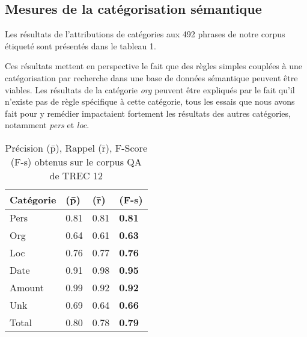 \documentclass[10pt,a4paper]{article}
\begin{document}

\subsection{Mesures de la catégorisation sémantique}\label{evaluation}

\par Les résultats de l'attributions de catégories aux 492 phrases de notre corpus étiqueté sont présentés dans le tableau 1. 
\par Ces résultats mettent en perspective le fait que des règles simples couplées à une catégorisation par recherche dans une base de données sémantique peuvent être viables. Les résultats de la catégorie \emph{org} peuvent être expliqués par le fait qu'il n'existe pas de règle spécifique à cette catégorie, tous les essais que nous avons fait pour y remédier impactaient fortement les résultats des autres catégories, notamment \emph{pers} et \emph{loc}.

\begin{table}[h]
    \begin{center}
        \begin{tabular}{|p{2.5cm}|l|l|l|}
            \hline
            Catégorie & (\={p}) & (\={r}) & (\={F}-s) \\
            \hline
            Pers & 0.81 & 0.81 & \textbf{0.81} \\
            \hline
            Org & 0.64 & 0.61 & \textbf{0.63} \\
            \hline
            Loc & 0.76 & 0.77 & \textbf{0.76} \\
            \hline
            Date & 0.91 & 0.98 & \textbf{0.95} \\
            \hline
            Amount & 0.99 & 0.92 & \textbf{0.92} \\
            \hline
            Unk & 0.69 & 0.64 & \textbf{0.66} \\
            \hline
            \hline
            Total & 0.80 & 0.78 & \textbf{0.79} \\
            \hline
        \end{tabular}
        \caption{\label{tab:results}Précision (\={p}), Rappel (\={r}), F-Score (\={F}-s) obtenus sur le corpus QA de TREC 12}
    \end{center}
\end{table}
\end{document}
